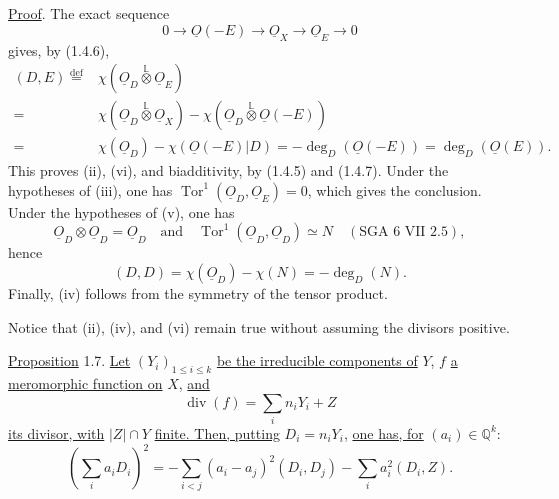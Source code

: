 \underline{Proof}. The exact sequence
\begin{equation*}
0\longrightarrow\underline O(-E)\longrightarrow\underline O_X
\longrightarrow\underline O_E\longrightarrow0
\end{equation*}
gives, by (1.4.6),
\begin{equation*}
\begin{array}{rl}
(D,E)\overset{\mathrm{def}}{=}&
\chi(\underline{O}_D\overset{\mathbb L}{\otimes}\underline{O}_E)\\
=&\chi(\underline{O}_D\overset{\mathbb L}{\otimes}\underline{O}_X)
-\chi(\underline{O}_D\overset{\mathbb L}{\otimes}\underline O(-E))\\[1ex]
=&\chi(\underline{O}_D)-\chi(\underline O(-E)|D)
=-\deg_D(\underline O(-E))=\deg_D(\underline O(E)).
\end{array}
\end{equation*}
This proves (ii), (vi), and biadditivity, by (1.4.5) and (1.4.7).  Under the
hypotheses of (iii), one has
$\operatorname{Tor}^1(\underline{O}_D,\underline{O}_E)=0$, which gives the
conclusion.  Under the hypotheses of (v), one has
\begin{equation*}
\underline{O}_D\otimes\underline{O}_D=\underline{O}_D
\quad\text{and}\quad
\operatorname{Tor}^1(\underline{O}_D,\underline{O}_D)\simeq N
\quad(\text{SGA 6 VII 2.5}),
\end{equation*}
hence
\begin{equation*}
(D,D)=\chi(\underline{O}_D)-\chi(N)=-\deg_D(N).
\end{equation*}
Finally, (iv) follows from the symmetry of the tensor product.

Notice that (ii), (iv), and (vi) remain true without assuming the divisors positive.


\underline{Proposition} 1.7. \underline{Let} $(Y_i)_{1\leq i\leq k}$
\underline{be the irreducible components of} $Y$, $f$ \underline{a meromorphic
function on} $X$, \underline{and}
\begin{equation*}
\operatorname{div}(f)=\sum_i n_iY_i+Z
\end{equation*}
\underline{its divisor, with} $|Z|\cap Y$ \underline{finite. Then, putting}
$D_i=n_iY_i$, \underline{one has, for} $(a_i)\in\mathbb Q^k$:
\begin{equation*}
\left(\sum_i a_iD_i\right)^2
=-\sum_{i<j}(a_i-a_j)^2(D_i,D_j)-\sum_i a_i^2(D_i,Z).
\end{equation*}

